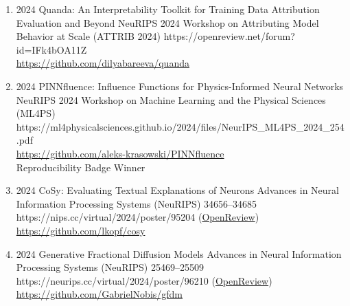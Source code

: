 {\begin{enumerate}
        \item {}
                        {2024}
                        {Quanda: An Interpretability Toolkit for Training Data Attribution Evaluation and Beyond}
                        {NeuRIPS 2024 Workshop on Attributing Model Behavior at Scale (ATTRIB 2024)}
                        {}
                        {https://openreview.net/forum?id=IFk4bOA11Z}
                        {
                        \\
                        \href{https://github.com/dilyabareeva/quanda}{https://github.com/dilyabareeva/quanda}
                        }


        \item {}
                        {2024}
                        {PINNfluence: Influence Functions for Physics-Informed Neural Networks}
                        {NeuRIPS 2024 Workshop on Machine Learning and the Physical Sciences (ML4PS)}
                        {}
                        {https://ml4physicalsciences.github.io/2024/files/NeurIPS_ML4PS_2024_254.pdf}
                        {\\\href{https://github.com/aleks-krasowski/PINNfluence}{https://github.com/aleks-krasowski/PINNfluence}\\
                        Reproducibility Badge Winner}


        \item {}
                        {2024}
                        {CoSy: Evaluating Textual Explanations of Neurons}
                        {Advances in Neural Information Processing Systems (NeuRIPS)}
                        {34656--34685}
                        {https://nips.cc/virtual/2024/poster/95204}
                        {(\href{https://openreview.net/forum?id=2g84EvFlRt}{OpenReview})\\
                        \href{https://github.com/lkopf/cosy}{https://github.com/lkopf/cosy}
                        }


        \item {}
                        {2024}
                        {Generative Fractional Diffusion Models}
                        {Advances in Neural Information Processing Systems (NeuRIPS)}
                        {25469--25509}
                        {https://neurips.cc/virtual/2024/poster/96210}
                        {(\href{https://openreview.net/forum?id=B9qg3wo75g}{OpenReview})\\
                        \href{https://github.com/GabrielNobis/gfdm}{https://github.com/GabrielNobis/gfdm}
                        }


\end{enumerate}}
